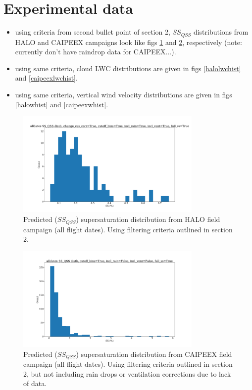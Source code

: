 \documentclass{article}
\begin{document}
\section{Experimental data}
\begin{itemize}
	\item using criteria from second bullet point of section 2, $SS_{QSS}$ distributions from HALO and CAIPEEX campaigns look like figs \ref{haloqsshist} and \ref{caipeexqsshist}, respectively (note: currently don't have raindrop data for CAIPEEX...). 
	\item using same criteria, cloud LWC distributions are given in figs \ref{halolwchist} and \ref{caipeexlwchist}. 
	\item using same criteria, vertical wind velocity distributions are given in figs \ref{halowhist} and \ref{caipeexwhist}. 
\end{itemize}
\begin{figure}[ht]
    \centering
    \includegraphics[width=9cm]{revhalo/v24_ss_qss_hist_cas_alldates_figure.png}
    \caption{Predicted ($SS_{QSS}$) supersaturation distribution from HALO field campaign (all flight dates). Using filtering criteria outlined in section 2.}
    \label{haloqsshist}
\end{figure}
\begin{figure}[ht]
    \centering
    \includegraphics[width=9cm]{revcaipeex/v10_ss_qss_hist_alldates_figure.png}
    \caption{Predicted ($SS_{QSS}$) supersaturation distribution from CAIPEEX field campaign (all flight dates). Using filtering criteria outlined in section 2, but not including rain drops or ventilation corrections due to lack of data.}
    \label{caipeexqsshist}
\end{figure}
\end{document}

